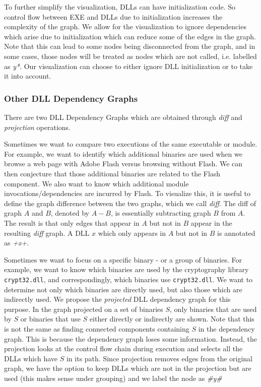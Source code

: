 To further simplify the visualization, DLLs can have initialization code.
So control flow between EXE and DLLs due to initialization increases
the complexity of the graph. We allow for the visualization to ignore
dependencies which arise due to initialization which can reduce some
of the edges in the graph.
Note that this can lead to some nodes being disconnected from the graph,
and in some cases, those nodes will be treated as nodes which are not called,
i.e. labelled as {\it *y*}.
Our visualization can choose to either ignore DLL initialization or
to take it into account.

\subsubsection{Other DLL Dependency Graphs}

There are two DLL Dependency Graphs
which are obtained through {\em diff} and {\em projection} operations.

Sometimes we want to compare two executions of the same executable or
module.
For example, we want to identify which additional binaries are used when
we browse a web page with Adobe Flash versus browsing without Flash.
We can then conjecture that those additional binaries are related to the
Flash component.
We also want to know which additional module invocations/dependencies
are incurred by Flash.
To visualize this,
it is useful to define the graph difference between the two graphs,
which we call {\em diff}.
The diff of graph $A$ and $B$, denoted by $A-B$,
is essentially subtracting graph $B$ from $A$.
The result is that only edges that appear in $A$ but not in $B$ appear
in the resulting {\em diff} graph.
A DLL $x$ which only appears in $A$ but not in $B$ is annotated
as {\it +x+}.

Sometimes we want to focus on a specific binary - or a group of binaries.
For example, we want to know which binaries are used by the cryptography
library {\tt crypt32.dll}, and correspondingly,
which binaries use {\tt crypt32.dll}.
We want to determine not only which binaries are directly used,
but also those which are indirectly used.
We propose the {\em projected} DLL dependency graph for this purpose.
In the graph projected on a set of binaries $S$,
only binaries that are used by $S$ or binaries that use $S$ either directly
or indirectly are shown.
Note that this is not the same as finding connected components containing
$S$ in the dependency graph.
This is because the dependency graph loses some information.
Instead, the projection looks at the control flow chain during
execution and selects all the DLLs which have $S$ in its path.
Since projection removes edges from the original graph, we have the
option to keep DLLs which are not in the projection but are used
(this makes sense under grouping) and we label the node as {\it \#y\#}

